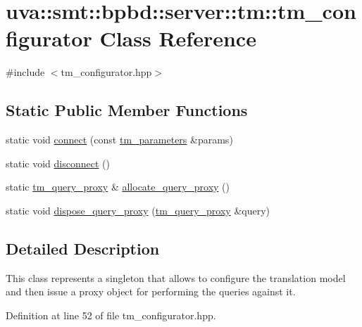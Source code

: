 \hypertarget{classuva_1_1smt_1_1bpbd_1_1server_1_1tm_1_1tm__configurator}{}\section{uva\+:\+:smt\+:\+:bpbd\+:\+:server\+:\+:tm\+:\+:tm\+\_\+configurator Class Reference}
\label{classuva_1_1smt_1_1bpbd_1_1server_1_1tm_1_1tm__configurator}


{\ttfamily \#include $<$tm\+\_\+configurator.\+hpp$>$}

\subsection*{Static Public Member Functions}
\begin{DoxyCompactItemize}
\item 
static void \hyperlink{classuva_1_1smt_1_1bpbd_1_1server_1_1tm_1_1tm__configurator_a0057812ca0b8984065cc352da90e80ee}{connect} (const \hyperlink{structuva_1_1smt_1_1bpbd_1_1server_1_1tm_1_1tm__parameters}{tm\+\_\+parameters} \&params)
\item 
static void \hyperlink{classuva_1_1smt_1_1bpbd_1_1server_1_1tm_1_1tm__configurator_a763501de4321cc3e62033d432ed694e4}{disconnect} ()
\item 
static \hyperlink{classuva_1_1smt_1_1bpbd_1_1server_1_1tm_1_1proxy_1_1tm__query__proxy}{tm\+\_\+query\+\_\+proxy} \& \hyperlink{classuva_1_1smt_1_1bpbd_1_1server_1_1tm_1_1tm__configurator_ab96151478cd38eca51b4ee4c0e27066a}{allocate\+\_\+query\+\_\+proxy} ()
\item 
static void \hyperlink{classuva_1_1smt_1_1bpbd_1_1server_1_1tm_1_1tm__configurator_ae7839ac82b0f55f91459636e2db26df9}{dispose\+\_\+query\+\_\+proxy} (\hyperlink{classuva_1_1smt_1_1bpbd_1_1server_1_1tm_1_1proxy_1_1tm__query__proxy}{tm\+\_\+query\+\_\+proxy} \&query)
\end{DoxyCompactItemize}


\subsection{Detailed Description}
This class represents a singleton that allows to configure the translation model and then issue a proxy object for performing the queries against it. 

Definition at line 52 of file tm\+\_\+configurator.\+hpp.



